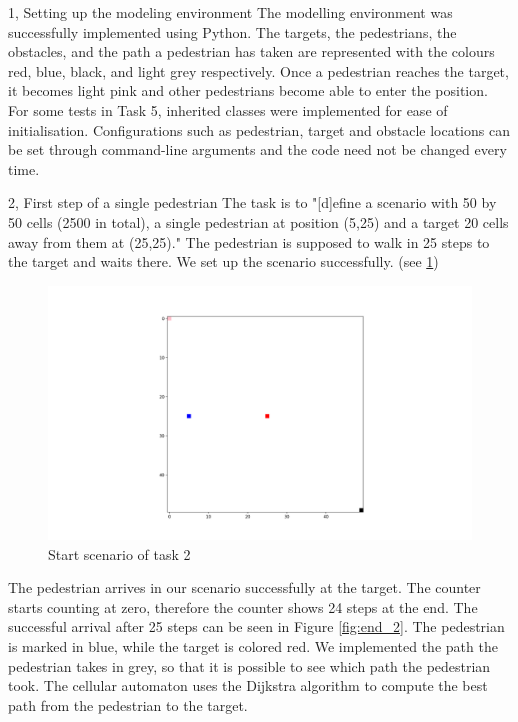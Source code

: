 \documentclass[10pt,a4paper]{article}
\begin{document}
\frontpage

\begin{task}{1, Setting up the modeling environment}
The modelling environment was successfully implemented using Python. The targets, the pedestrians, the obstacles, and the path a pedestrian has taken are represented with the colours red, blue, black, and light grey respectively. Once a pedestrian reaches the target, it becomes light pink and other pedestrians become able to enter the position. For some tests in Task 5, inherited classes were implemented for ease of initialisation. Configurations such as pedestrian, target and obstacle locations can be set through command-line arguments and the code need not be changed every time. \\
\end{task}
\begin{task}{2, First step of a single pedestrian}
The task is to "[d]efine a scenario with 50 by 50 cells (2500 in total), a single pedestrian at position (5,25) and a target 20 cells away from them at (25,25)." The pedestrian is supposed to walk in 25 steps to the target and waits there. We set up the scenario successfully. (see \ref{fig:start_2})
\begin{figure}[h!]
    \centering
    \includegraphics[width=\textwidth]{pictures/2_Start.png}
    \caption{Start scenario of task 2}
    \label{fig:start_2}
\end{figure}
\newpage
The pedestrian arrives in our scenario successfully at the target. The counter starts counting at zero, therefore the counter shows 24 steps at the end. The successful arrival after 25 steps can be seen in Figure \ref{fig:end_2}. The pedestrian is marked in blue, while the target is colored red. We implemented the path the pedestrian takes in grey, so that it is possible to see which path the pedestrian took. The cellular automaton uses the Dijkstra algorithm to compute the best path from the pedestrian to the target.

\end{task}
\end{document}
